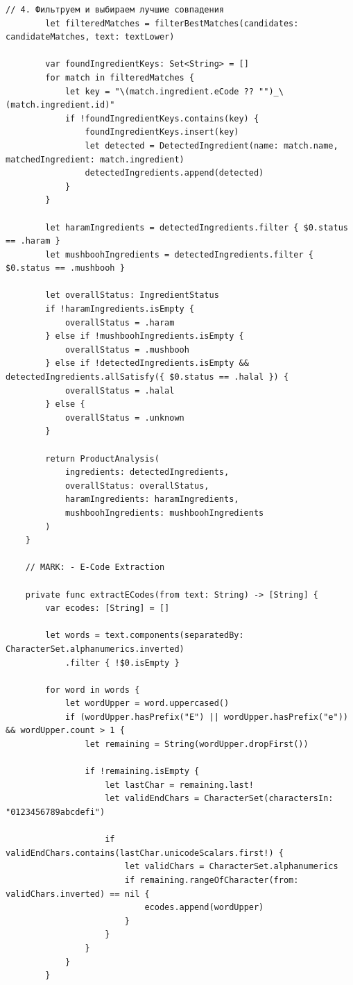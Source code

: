 \begin{lstlisting}[basicstyle=\tiny\ttfamily,breaklines=true]
        // 4. Фильтруем и выбираем лучшие совпадения
        let filteredMatches = filterBestMatches(candidates: candidateMatches, text: textLower)

        var foundIngredientKeys: Set<String> = []
        for match in filteredMatches {
            let key = "\(match.ingredient.eCode ?? "")_\(match.ingredient.id)"
            if !foundIngredientKeys.contains(key) {
                foundIngredientKeys.insert(key)
                let detected = DetectedIngredient(name: match.name, matchedIngredient: match.ingredient)
                detectedIngredients.append(detected)
            }
        }

        let haramIngredients = detectedIngredients.filter { $0.status == .haram }
        let mushboohIngredients = detectedIngredients.filter { $0.status == .mushbooh }

        let overallStatus: IngredientStatus
        if !haramIngredients.isEmpty {
            overallStatus = .haram
        } else if !mushboohIngredients.isEmpty {
            overallStatus = .mushbooh
        } else if !detectedIngredients.isEmpty && detectedIngredients.allSatisfy({ $0.status == .halal }) {
            overallStatus = .halal
        } else {
            overallStatus = .unknown
        }

        return ProductAnalysis(
            ingredients: detectedIngredients,
            overallStatus: overallStatus,
            haramIngredients: haramIngredients,
            mushboohIngredients: mushboohIngredients
        )
    }

    // MARK: - E-Code Extraction

    private func extractECodes(from text: String) -> [String] {
        var ecodes: [String] = []

        let words = text.components(separatedBy: CharacterSet.alphanumerics.inverted)
            .filter { !$0.isEmpty }

        for word in words {
            let wordUpper = word.uppercased()
            if (wordUpper.hasPrefix("E") || wordUpper.hasPrefix("e")) && wordUpper.count > 1 {
                let remaining = String(wordUpper.dropFirst())

                if !remaining.isEmpty {
                    let lastChar = remaining.last!
                    let validEndChars = CharacterSet(charactersIn: "0123456789abcdefi")

                    if validEndChars.contains(lastChar.unicodeScalars.first!) {
                        let validChars = CharacterSet.alphanumerics
                        if remaining.rangeOfCharacter(from: validChars.inverted) == nil {
                            ecodes.append(wordUpper)
                        }
                    }
                }
            }
        }


\end{lstlisting}
